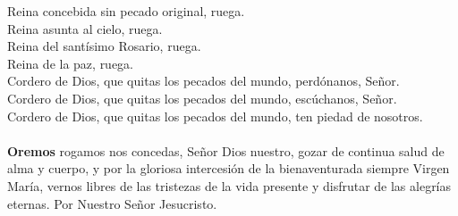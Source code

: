 \documentclass[10pt,a4paper,oneside]{book}
\begin{document}
\begin{minipage}[t]{0.475\textwidth}
    Reina concebida sin pecado original, ruega.\\
    Reina asunta al cielo, ruega.\\
    Reina del santísimo Rosario, ruega.\\
    Reina de la paz, ruega.\\
    Cordero de Dios, que quitas los pecados del mundo, perdónanos, Señor.\\
    Cordero de Dios, que quitas los pecados del mundo, escúchanos, Señor.\\
    Cordero de Dios, que quitas los pecados del mundo, ten piedad de nosotros.\\
    \ruegapornosotrossalve\\

    \textbf{Oremos}
     rogamos nos concedas, Señor Dios nuestro, gozar de continua salud de alma y cuerpo, y por la gloriosa intercesión de la 
    bienaventurada siempre Virgen María, vernos libres de las tristezas de la vida presente y disfrutar de las alegrías eternas.
    Por Nuestro Señor Jesucristo. \\
\end{minipage}
\end{document}
